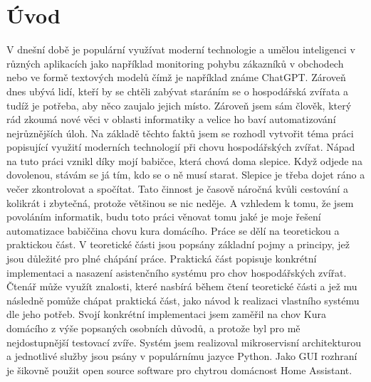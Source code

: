 \chapter{Úvod}
V dnešní době je populární využívat moderní technologie a umělou inteligenci v různých aplikacích jako například monitoring pohybu zákazníků v obchodech nebo ve formě textových modelů čímž je například známe ChatGPT. Zároveň dnes ubývá lidí, kteří by se chtěli zabývat staráním se o hospodářská zvířata a tudíž je potřeba, aby něco zaujalo jejich místo. Zároveň jsem sám člověk, který rád zkoumá nové věci v oblasti informatiky a velice ho baví automatizování nejrůznějších úloh. Na základě těchto faktů jsem se rozhodl vytvořit téma práci popisující využití moderních technologií při chovu hospodářských zvířat. Nápad na tuto práci vznikl díky mojí babičce, která chová doma slepice. Když odjede na dovolenou, stávám se já tím, kdo se o ně musí starat. Slepice je třeba dojet ráno a večer zkontrolovat a spočítat. Tato činnost je časově náročná kvůli cestování a kolikrát i zbytečná, protože většinou se nic neděje. A vzhledem k tomu, že jsem povoláním informatik, budu toto práci věnovat tomu jaké je moje řešení automatizace babiččina chovu kura domácího.
\newline
Práce se dělí na teoretickou a praktickou část. V teoretické části jsou popsány základní pojmy a principy, jež jsou důležité pro plné chápání práce. Praktická část popisuje konkrétní implementaci a nasazení asistenčního systému pro chov hospodářských zvířat. Čtenář může využít znalosti, které nasbírá během čtení teoretické části a jež mu následně pomůže chápat praktická část, jako návod k realizaci vlastního systému dle jeho potřeb.
\newline
Svojí konkrétní implementaci jsem zaměřil na chov Kura domácího z výše popsaných osobních důvodů, a protože byl pro mě nejdostupnější testovací zvíře. Systém jsem realizoval mikroservisní architekturou a jednotlivé služby jsou psány v populárnímu jazyce Python. Jako GUI rozhraní je šikovně použit open source software pro chytrou domácnost Home Assistant.
\newline
